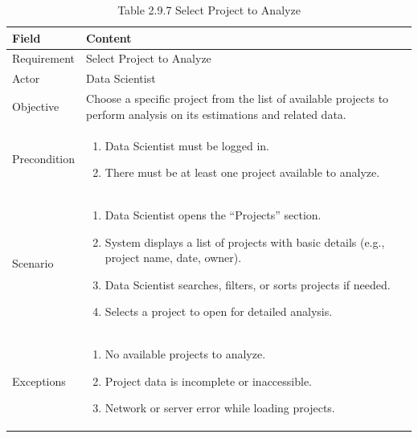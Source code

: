 \documentclass[12pt,oneside]{report}
\begin{document}
\begin{table}[H]
\centering
\caption{Table 2.9.7 Select Project to Analyze}
\label{tab:ds-select-project}
\begin{tabularx}{\textwidth}{|p{3cm}|X|}
\hline
\textbf{Field} & \textbf{Content} \\ \hline

Requirement & Select Project to Analyze \\ \hline

Actor & Data Scientist \\ \hline

Objective & Choose a specific project from the list of available projects to perform analysis on its estimations and related data. \\ \hline

Precondition & 
\begin{minipage}[t]{0.75\textwidth}
\begin{enumerate}[leftmargin=*,label=\arabic*.]
\item Data Scientist must be logged in.
\item There must be at least one project available to analyze.
\end{enumerate}
\end{minipage} \\ \hline

Scenario & 
\begin{minipage}[t]{0.75\textwidth}
\begin{enumerate}[leftmargin=*,label=\arabic*.]
\item Data Scientist opens the “Projects” section.
\item System displays a list of projects with basic details (e.g., project name, date, owner).
\item Data Scientist searches, filters, or sorts projects if needed.
\item Selects a project to open for detailed analysis.
\end{enumerate}
\end{minipage} \\ \hline

Exceptions & 
\begin{minipage}[t]{0.75\textwidth}
\begin{enumerate}[leftmargin=*,label=\arabic*.]
\item No available projects to analyze.
\item Project data is incomplete or inaccessible.
\item Network or server error while loading projects.
\end{enumerate}
\end{minipage} \\ \hline

\end{tabularx}
\end{table}
\end{document}
